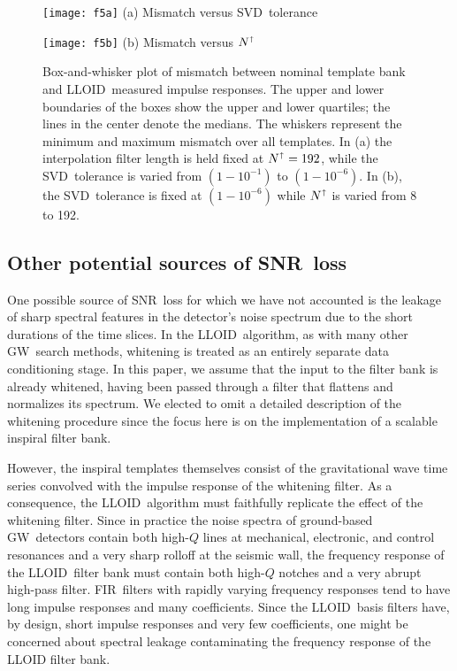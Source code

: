 \documentclass[preprint2]{aastex}
\newcommand{\GW}{GW}%
\newcommand{\SNR}{SNR}%
\newcommand{\SVD}{SVD}%
\newcommand{\fir}{FIR}%
\newcommand{\lloid}{LLOID}%
\begin{document}
\begin{figure*}[b]
	\begin{minipage}[t]{0.5\textwidth}
		\begin{center}
			\texttt{[image: f5a]}
			(a) Mismatch versus \SVD\ tolerance
		\end{center}
	\end{minipage}
	\begin{minipage}[t]{0.5\textwidth}
		\begin{center}
			\texttt{[image: f5b]}
			(b) Mismatch versus $N^\shortuparrow$
		\end{center}
	\end{minipage}
	\caption{\label{fig:bw}Box-and-whisker plot of mismatch between nominal
template bank and \lloid\ measured impulse responses.  The upper and lower boundaries of
the boxes show the upper and lower quartiles; the lines in the center denote the medians.
The whiskers represent the minimum and maximum mismatch over all templates.  In 
(a) the interpolation filter length is held fixed at $N^\shortuparrow = 192$, while
the \SVD\ tolerance is varied from $\left(1-10^{-1}\right)$ to $\left(1-10^{-6}\right)$.
In (b), the \SVD\ tolerance is fixed at $\left(1-10^{-6}\right)$ while $N^\shortuparrow$
is varied from 8 to 192.}
\end{figure*}

\subsection{Other potential sources of \SNR\ loss}

One possible source of \SNR\ loss for which we have not accounted is the leakage of sharp spectral features in the detector's noise spectrum due to the short durations of the time slices.  In the \lloid\ algorithm, as with many other \GW\ search methods, whitening is treated as an entirely separate data conditioning stage.  In this paper, we assume that the input to the filter bank is already whitened, having been passed through a filter that flattens and normalizes its spectrum.  We elected to omit a detailed description of the whitening procedure since the focus here is on the implementation of a scalable inspiral filter bank.

However, the inspiral templates themselves consist of the gravitational wave time series convolved with the impulse response of the whitening filter.  As a consequence, the \lloid\ algorithm must faithfully replicate the effect of the whitening filter.  Since in practice the noise spectra of ground-based \GW\ detectors contain both high-$Q$ lines at mechanical, electronic, and control resonances and a very sharp rolloff at the seismic wall, the frequency response of the \lloid\ filter bank must contain both high-$Q$ notches and a very abrupt high-pass filter.  \fir\ filters with rapidly varying frequency responses tend to have long impulse responses and many coefficients.  Since the \lloid\ basis filters have, by design, short impulse responses and very few coefficients, one might be concerned about spectral leakage contaminating the frequency response of the LLOID filter bank.
\end{document}
